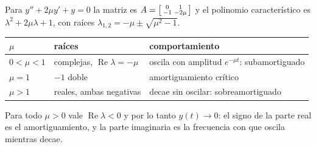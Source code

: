 \documentclass[11pt,a4paper]{article}
\DeclareMathOperator{\Real}{Re}
\begin{document}
Para $y''+2\mu y'+y=0$ la matriz es
$A=\begin{bsmallmatrix}0&1\\-1&-2\mu\end{bsmallmatrix}$ y el polinomio
característico es $\lambda^2+2\mu\lambda+1$, con raíces
$\lambda_{1,2}=-\mu\pm\sqrt{\mu^2-1}$.
\begin{center}
\begin{tabular}{@{}lll@{}}
\hline
$\mu$ & raíces & comportamiento\\
\hline
$0<\mu<1$ & complejas, $\Real\lambda=-\mu$ & oscila con amplitud $e^{-\mu t}$: subamortiguado\\
$\mu=1$ & $-1$ doble & amortiguamiento crítico\\
$\mu>1$ & reales, ambas negativas & decae sin oscilar: sobreamortiguado\\
\hline
\end{tabular}
\end{center}
Para todo $\mu>0$ vale $\Real\lambda<0$ y por lo tanto $y(t)\to0$: el signo de la
parte real es el amortiguamiento, y la parte imaginaria es la frecuencia con que
oscila mientras decae.
\end{document}
